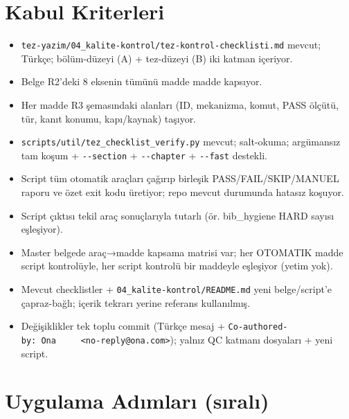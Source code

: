 \documentclass[
  turkish,
  12pt,
  a4paper,
]{report}
\providecommand{\tightlist}{%
  \setlength{\itemsep}{0pt}\setlength{\parskip}{0pt}}
\begin{document}
\section{Kabul Kriterleri}\label{kabul-kriterleri}

\begin{itemize}
\tightlist
\item[$\square$]
  \texttt{tez-yazim/04\_kalite-kontrol/tez-kontrol-checklisti.md}
  mevcut; Türkçe; bölüm-düzeyi (A) + tez-düzeyi (B) iki katman içeriyor.
\item[$\square$]
  Belge R2'deki 8 eksenin tümünü madde madde kapsıyor.
\item[$\square$]
  Her madde R3 şemasındaki alanları (ID, mekanizma, komut, PASS ölçütü,
  tür, kanıt konumu, kapı/kaynak) taşıyor.
\item[$\square$]
  \texttt{scripts/util/tez\_checklist\_verify.py} mevcut; salt-okuma;
  argümansız tam koşum + \texttt{-\/-section} + \texttt{-\/-chapter} +
  \texttt{-\/-fast} destekli.
\item[$\square$]
  Script tüm otomatik araçları çağırıp birleşik PASS/FAIL/SKIP/MANUEL
  raporu ve özet exit kodu üretiyor; repo mevcut durumunda hatasız
  koşuyor.
\item[$\square$]
  Script çıktısı tekil araç sonuçlarıyla tutarlı (ör. bib\_hygiene HARD
  sayısı eşleşiyor).
\item[$\square$]
  Master belgede araç→madde kapsama matrisi var; her OTOMATIK madde
  script kontrolüyle, her script kontrolü bir maddeyle eşleşiyor (yetim
  yok).
\item[$\square$]
  Mevcut checklistler + \texttt{04\_kalite-kontrol/README.md} yeni
  belge/script'e çapraz-bağlı; içerik tekrarı yerine referans
  kullanılmış.
\item[$\square$]
  Değişiklikler tek toplu commit (Türkçe mesaj +
  \texttt{Co-authored-by:\ Ona\ \ \ \ \ \textless{}no-reply@ona.com\textgreater{}});
  yalnız QC katmanı dosyaları + yeni script.
\end{itemize}

\section{Uygulama Adımları
(sıralı)}\label{uygulama-adux131mlarux131-sux131ralux131}
\end{document}

